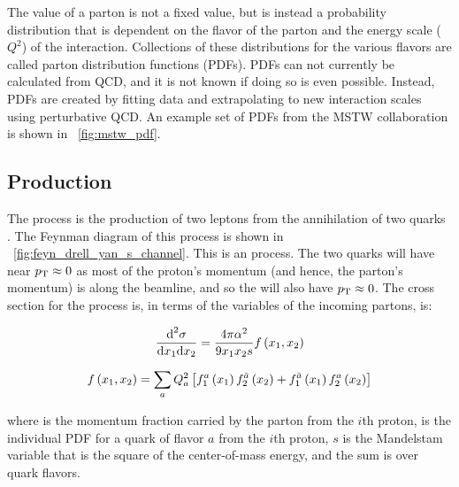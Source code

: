 The  value of a parton is not a fixed value, but is instead a
probability distribution that is dependent on the flavor of the parton and the
energy scale ($Q^{2}$) of the interaction. Collections of these distributions
for the various flavors are called parton distribution functions (PDFs). PDFs
can not currently be calculated from QCD, and it is not known if doing so is
even possible. Instead, PDFs are created by fitting data and extrapolating to
new interaction scales using perturbative QCD. An example set of PDFs from the
MSTW collaboration\cite{martin_2009} is shown in \FIG~\ref{fig:mstw_pdf}.



\subsection{\DrellYan Production}
\label{ssec:dy_production}

The \DrellYan process is the production of two leptons from the annihilation of
two quarks \cite{drell_1970}\cite{drell_1970a}. The Feynman diagram of this
process is shown in \FIG~\ref{fig:feyn_drell_yan_s_channel}. This is an
\sChannel process. The two quarks will have near $p_{\mathrm{T}} \approx 0$ as most of the
proton's momentum (and hence, the parton's momentum) is along the beamline, and
so the \Z will also have $p_{\mathrm{T}} \approx 0$. The cross section for the \DrellYan
process is, in terms of the  variables of the incoming partons, is:

\begin{equation}\label{eq:drell_yan_cross_section}
    \frac{\text{d}^{2}\sigma}
    {\text{d}x_{1} \text{d}x_{2}}
    =
    \frac{4 \pi \alpha^{2}}
    {9 x_{1} x_{2} s}
    f \left( x_{1}, x_{2} \right)
\end{equation}

\begin{equation}\label{eq:fx}
    f \left( x_{1}, x_{2} \right)
    =
    \sum_{a}
    Q^{2}_{a}
    \left[
        f^{a}_{1} \left( x_{1} \right)
        f^{\bar{a}}_{2} \left( x_{2} \right)
        +
        f^{\bar{a}}_{1} \left( x_{1} \right)
        f^{a}_{2} \left( x_{2} \right)
    \right]
\end{equation}

where  is the momentum fraction carried by the parton from the
$i$th proton,  is the individual PDF for a quark of
flavor $a$ from the $i$th proton, $s$ is the Mandelstam variable that is
the square of the center-of-mass energy, and the sum is over quark flavors.


